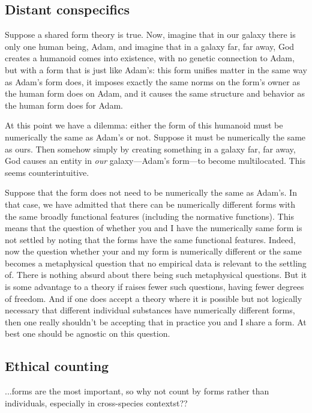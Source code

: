 \subsection{Distant conspecifics}
Suppose a shared form theory is true. Now, imagine that in our galaxy there is only one human being, Adam, and imagine that in 
a galaxy far, far away, God creates a humanoid comes into existence, with no genetic connection to Adam, but with a form that 
is just like Adam's: this form unifies matter in the same way as
Adam's form does, it imposes exactly the same norms on the form's owner as the human form does on Adam, and it causes the same
structure and behavior as the human form does for Adam. 

At this point we have a dilemma: either the form of this humanoid must be numerically the same as Adam's or not. Suppose it 
must be numerically the same as ours. Then somehow simply by creating something in a galaxy far, far away, God causes an
entity in \textit{our} galaxy---Adam's form---to become multilocated. This seems counterintuitive. 

Suppose that the form does not need to be numerically the same as Adam's. In that case, we have admitted that there can 
be numerically different forms with the same broadly functional features (including the normative functions). This 
means that the question of whether you and I have the  numerically same form is not settled by noting that the forms have 
the same functional features. Indeed, now the question whether your and my form is numerically different or the same becomes
a metaphysical question that no empirical data is relevant to the settling of. There is nothing absurd about there being
such metaphysical questions. But it is some advantage to a theory if raises fewer such questions, having fewer degrees of 
freedom. And if one does accept a theory where it is possible but not logically necessary that different individual substances
have numerically different forms, then one really shouldn't be accepting that in practice you and I share a form. At best
one should be agnostic on this question.

\subsection{Ethical counting}
...forms are the most important, so why not count by forms rather than individuals, especially in cross-species contextst??

\chaptertail
